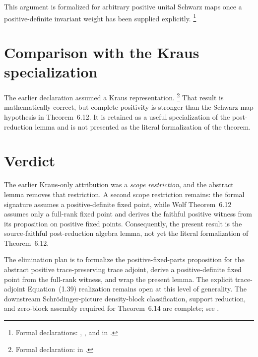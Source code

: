 \documentclass{article}
\begin{document}
This argument is formalized for arbitrary positive unital Schwarz maps once a
positive-definite invariant weight has been supplied explicitly.
\footnote{Formal declarations:
  ,
  , and
   in
  .}

\section{Comparison with the Kraus specialization}

The earlier declaration assumed a Kraus representation.
\footnote{Formal declaration:
   in
  .}
That result is mathematically correct, but complete positivity is stronger than
the Schwarz-map hypothesis in Theorem~6.12.  It is retained as a useful
specialization of the post-reduction lemma and is not presented as the literal
formalization of the theorem.

\section{Verdict}

The earlier Kraus-only attribution was a \emph{scope restriction}, and the
abstract lemma removes that restriction.  A second scope restriction remains:
the formal signature assumes a positive-definite fixed point, while Wolf
Theorem~6.12 assumes only a full-rank fixed point and derives the faithful
positive witness from its proposition on positive fixed points.  Consequently,
the present result is the source-faithful post-reduction algebra lemma, not yet
the literal formalization of Theorem~6.12.

The elimination plan is to formalize the positive-fixed-parts proposition for
the abstract positive trace-preserving trace adjoint, derive a positive-definite
fixed point from the full-rank witness, and wrap the present lemma.  The
explicit trace-adjoint Equation~(1.39) realization remains open at this level
of generality.  The downstream Schrödinger-picture density-block
classification, support reduction, and zero-block assembly required for
Theorem~6.14 are complete; see
.



\end{document}
